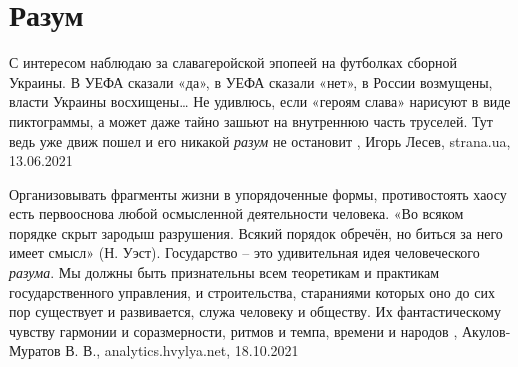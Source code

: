  
 
 
 
 
\chapter{Разум}
\label{sec:slova.razum}

С интересом наблюдаю за славагеройской эпопеей на футболках сборной Украины. В
УЕФА сказали «да», в УЕФА сказали «нет», в России возмущены, власти Украины
восхищены… Не удивлюсь, если «героям слава» нарисуют в виде пиктограммы, а
может даже тайно зашьют на внутреннюю часть труселей. Тут ведь уже движ пошел и
его никакой \emph{разум} не остановит
, 
Игорь Лесев, strana.ua, 13.06.2021

Организовывать фрагменты жизни в упорядоченные формы, противостоять хаосу есть
первооснова любой осмысленной деятельности человека. «Во всяком порядке скрыт
зародыш разрушения. Всякий порядок обречён, но биться за него имеет смысл» (Н.
Уэст).  Государство – это удивительная идея человеческого \emph{разума}. Мы должны
быть признательны всем теоретикам и практикам государственного управления, и
строительства, стараниями которых оно до сих пор существует и развивается,
служа человеку и обществу. Их фантастическому чувству гармонии и соразмерности,
ритмов и темпа, времени и народов
, 
Акулов-Муратов В. В., analytics.hvylya.net, 18.10.2021
